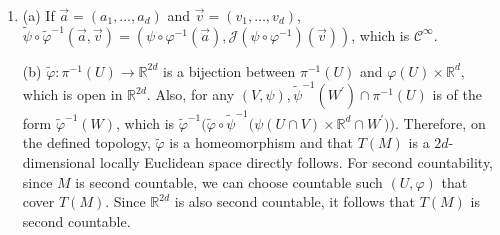 \begin{enumerate}
Then by regularity, $\forall c \in C$, $\exists$ open subset $U_{c}, V_{c} \subset M$ 
s.t. $c \in U_{c}, D \subset V_{c}$, and $U_{c} \cap V_{c}=\varnothing$. 
Then $\left\{U_{c}\right\}_{c \in C} \cup M \backslash C$ is an open cover of $M$. 
Hence, by paracompactness, there exists a refinement of $\left\{U_{c}\right\}_{c \in C} \cup M \backslash C$ which is locally finite. 
By discarding the open sets which do not intersect $C$, 
one can obtain an open cover of $C$ which is locally finite, 
say $\big\{\widetilde{U}_{\beta}\big\}$. 
Then, $\forall d \in D, \exists \widetilde{V_{d}}$ s.t. $\widetilde{V}_{d} \cap \widetilde{U}_{\beta} \neq \varnothing$ for only finite $\beta^{\prime}$'s, 
which we can label as $\beta_{1}, \ldots, \beta_{n}$. 
Since $\big\{\widetilde{U}_{\beta}\big\}$ is a refinement, 
one can find $c_{i} \in C$ for each $\beta_{i}$ s.t. $\widetilde{U}_{\beta_i} \subset U_{c_{i}}$. 
If we set $W_{d}=\widetilde{V_{d}} \cap \bigcap_{i=1}^{n} V_{c_{i}}$, 
then one can easily see that $\forall \beta, W_{d} \cap \widetilde{U}_{\beta}=\varnothing$ and $W_{d}$ is an open neighborhood of $d$. 
If we set $U=\bigcup \widetilde{U}_{\beta}, W=\bigcup W_{d}$, then each open set is a neighborhood of $C$ and $D$ respectively which does not intersect each other. 
Since $C$ and $D$ are arbitrary, $M$ is normal.
\item (a) If $\vec{a}=(a_{1}, \ldots, a_{d})$ and $\vec{v}=(v_{1}, \ldots, v_{d})$, 
$\tilde{\psi} \circ \tilde{\varphi}^{-1}(\vec{a}, \vec{v})=\left(\psi \circ \varphi^{-1}(\vec{a}), \mathcal{J}(\psi \circ \varphi^{-1})(\vec{v})\right)$, which is $\mathcal{C}^{\infty}$.

(b) $\tilde{\varphi}\colon \pi^{-1}(U) \rightarrow \mathbb{R}^{2d}$ is a bijection between $\pi^{-1}(U)$ and $\varphi(U) \times \mathbb{R}^{d}$, which is open in $\mathbb{R}^{2d}$. 
Also, for any $(V, \psi), \tilde{\psi}^{-1}(W^{\prime}) \cap \pi^{-1}(U)$ is of the form $\tilde{\varphi}^{-1}(W)$, 
which is $\tilde{\varphi}^{-1}\big(\tilde{\varphi} \circ \tilde{\psi}^{-1}\big(\psi(U \cap V) \times \mathbb{R}^{d} \cap W^{\prime}\big)\big)$. 
Therefore, on the defined topology, $\tilde{\varphi}$ is a homeomorphism and that $T(M)$ is a $2d$-dimensional locally Euclidean space directly follows. 
For second countability, since $M$ is second countable, we can choose countable such $(U, \varphi)$ that cover $T(M)$. 
Since $\mathbb{R}^{2d}$ is also second countable, it follows that $T(M)$ is second countable.


\end{enumerate}
